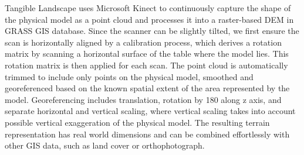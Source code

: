 \documentclass[prodmode,acmtochi]{acmsmall} %
\begin{document}



Tangible Landscape uses Microsoft Kinect to continuously capture the shape of the physical model
as a point cloud and processes it into a raster-based DEM in GRASS GIS database.
Since the scanner can be slightly tilted,
we first ensure the scan is horizontally aligned by a calibration process, which derives
a rotation matrix by scanning a horizontal surface of the table where the model lies.
This rotation matrix is then applied for each scan.
The point cloud is automatically trimmed to include only points on the physical model,
smoothed and georeferenced based on the known
spatial extent of the area represented by the model.
Georeferencing includes translation, rotation by 180\textdegree{} along z axis,
and separate horizontal and vertical scaling, where vertical scaling takes into
account possible vertical exaggeration of the physical model.
The resulting terrain representation has real world dimensions
and can be combined effortlessly with other GIS data, such as land cover or orthophotograph.
\end{document}
